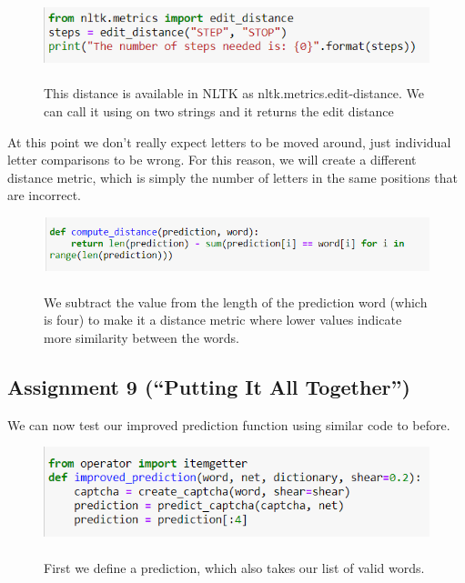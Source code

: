 \documentclass[onecolumn]{article}
\begin{document}
\begin{figure}[h]
    \centering
    \includegraphics[width=.7\linewidth]{57..png}
\caption{\label{fig:demo-bad}
\centering
\\This distance is available in NLTK as nltk.metrics.edit-distance. We can call
it using on two strings and it returns the edit distance }
\end{figure}

\begin{t}
 At this point we don't really expect letters to be moved around, just
individual letter comparisons to be wrong. For this reason, we will create a different
distance metric, which is simply the number of letters in the same positions that are
incorrect. 
\end{t}

\begin{figure}[h]
    \includegraphics[width=.8\linewidth]{58..png}
    \centering
\caption{\label{fig:demo-bad}
\centering
\\We subtract the value from the length of the prediction word (which is four) to make
it a distance metric where lower values indicate more similarity between the words. }
\end{figure}

\subsection{Assignment 9 (``Putting It All Together'')}

We can now test our improved prediction function using similar code to before.

\begin{figure}[hb!]
    \centering
    \includegraphics[width=.7\linewidth]{59..png}
\caption{\label{fig:demo-bad}
\centering
\\First we define a prediction, which also takes our list of valid words. }
\end{figure}
\end{document}
